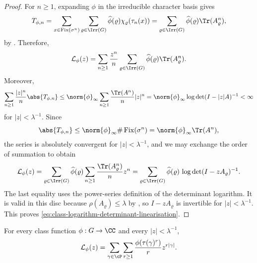 \begin{proof}
  For \(n\ge 1\), expanding \(\phi\) in the irreducible character basis
  gives
  \[
    T_{\phi,n}
    =\sum_{x\in\operatorname{Fix}(\sigma^n)}
      \sum_{\varrho\in\Irr(G)}
        \widehat\phi(\varrho)\chi_\varrho(\tau_n(x))
    =\sum_{\varrho\in\Irr(G)}
      \widehat\phi(\varrho)\Tr(A_\varrho^n),
  \]
  by . Therefore,
  \[
    \mathcal L_\phi(z)
    =\sum_{n\ge 1}\frac{z^n}{n}
      \sum_{\varrho\in\Irr(G)}
        \widehat\phi(\varrho)\Tr(A_\varrho^n).
  \]
  Moreover,
  \[
    \sum_{n\ge 1}\frac{|z|^n}{n}\abs{T_{\phi,n}}
    \le
    \norm{\phi}_\infty
    \sum_{n\ge 1}\frac{\Tr(A^n)}{n}|z|^n
    =
    \norm{\phi}_\infty \log\det(I-|z|A)^{-1}
    <\infty
  \]
  for \(|z|<\lambda^{-1}\). Since
  \[
    \abs{T_{\phi,n}}
    \le \norm{\phi}_\infty \#\operatorname{Fix}(\sigma^n)
    =\norm{\phi}_\infty \Tr(A^n),
  \]
  the series is absolutely convergent for \(|z|<\lambda^{-1}\), and we
  may exchange the order of summation to obtain
  \[
    \mathcal L_\phi(z)
    =
    \sum_{\varrho\in\Irr(G)}
      \widehat\phi(\varrho)
      \sum_{n\ge 1}\frac{\Tr(A_\varrho^n)}{n}z^n
    =
    \sum_{\varrho\in\Irr(G)}
      \widehat\phi(\varrho)\,
      \log\det(I-zA_\varrho)^{-1}.
  \]
  The last equality uses the power-series definition of the determinant
  logarithm. It is valid in this disc because
  \(\rho(A_\varrho)\le \lambda\) by
  , so
  \(I-zA_\varrho\) is invertible for \(|z|<\lambda^{-1}\).
  This proves \eqref{eq:class-logarithm-determinant-linearisation}.
\end{proof}

\begin{lemma}
  \label{lem:class-logarithm-primitive-expansion}
  For every class function \(\phi:G\to\CC\) and every
  \(|z|<\lambda^{-1}\),
  \begin{equation}\label{eq:class-logarithm-primitive-expansion}
    \mathcal L_\phi(z)
    =
    \sum_{\gamma\in\cP}\sum_{r\ge 1}
      \frac{\phi(\tau(\gamma)^r)}{r}z^{r|\gamma|}.
  \end{equation}
\end{lemma}

